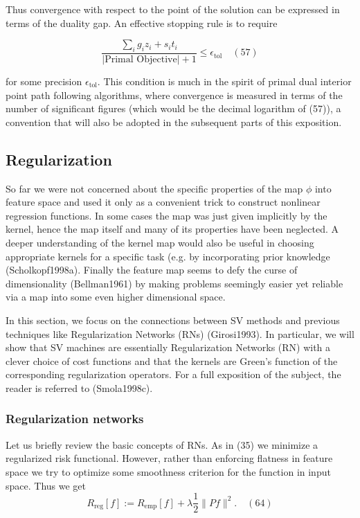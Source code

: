 \documentclass[fleqn,10pt]{olplainarticle}
\begin{document}
Thus convergence with respect to the point of the solution can be expressed in terms of the duality gap. An effective stopping rule is to require

\[
\frac{\sum_i g_i z_i + s_i t_i}{|\text{Primal Objective}| + 1} \leq \text{\(\epsilon_{\text{tol}}\)} \quad (57)
\]

for some precision \(\epsilon_{\text{tol}}\). This condition is much in the spirit of primal dual interior point path following algorithms, where convergence is measured in terms of the number of significant figures (which would be the decimal logarithm of (57)), a convention that will also be adopted in the subsequent parts of this exposition.

\subsection{Regularization}

So far we were not concerned about the specific properties of the map \( \phi \) into feature space and used it only as a convenient trick to construct nonlinear regression functions. In some cases the map was just given implicitly by the kernel, hence the map itself and many of its properties have been neglected. A deeper understanding of the kernel map would also be useful in choosing appropriate kernels for a specific task (e.g. by incorporating prior knowledge (Scholkopf1998a). Finally the feature map seems to defy the curse of dimensionality (Bellman1961) by making problems seemingly easier yet reliable via a map into some even higher dimensional space.

In this section, we focus on the connections between SV methods and previous techniques like Regularization Networks (RNs) (Girosi1993). In particular, we will show that SV machines are essentially Regularization Networks (RN) with a clever choice of cost functions and that the kernels are Green’s function of the corresponding regularization operators. For a full exposition of the subject, the reader is referred to (Smola1998c).

\subsubsection{Regularization networks}

Let us briefly review the basic concepts of RNs. As in (35) we minimize a regularized risk functional. However, rather than enforcing flatness in feature space we try to optimize some smoothness criterion for the function in input space. Thus we get
\[
R_{\text{reg}}[ f ] := R_{\text{emp}}[ f ] + \lambda \frac{1}{2} \| Pf \|^2. \quad (64)
\]
\end{document}
